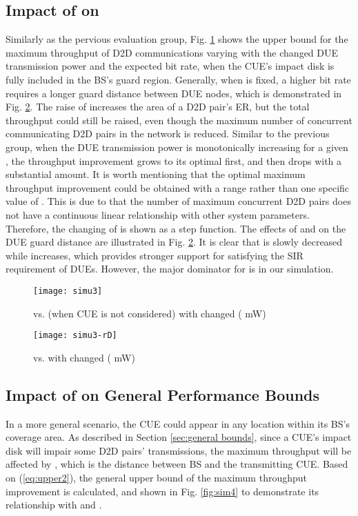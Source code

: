\documentclass[journal, 10pt]{IEEEtran}
\begin{document}
\subsection{Impact of  on }
Similarly as the pervious evaluation group, Fig. \ref{fig:sim2} shows
the upper bound for the maximum throughput of D2D communications
varying with the changed DUE transmission power and the expected bit
rate, when the CUE's impact disk is fully included in the BS's guard
region. Generally, when  is fixed, a higher bit rate
 requires a longer guard distance  between DUE nodes,
which is demonstrated in Fig. \ref{fig:sim2-rD}. The raise of 
increases the area of a D2D pair's ER, but the total throughput could
still be raised, even though the maximum number of concurrent
communicating D2D pairs in the network is reduced. Similar to the
previous group, when the DUE transmission power is monotonically
increasing for a given , the throughput improvement grows to its
optimal first, and then drops with a substantial amount. It is worth
mentioning that the optimal maximum throughput improvement could be
obtained with a range rather than one specific value of
. This is due to that the number of maximum concurrent
D2D pairs does not have a continuous linear relationship with other
system parameters. Therefore, the changing of 
is shown as a step function. The effects of
 and  on the DUE guard distance 
are illustrated in Fig. \ref{fig:sim2-rD}. It is clear that
 is slowly decreased while  increases,
which provides stronger support for satisfying the SIR requirement of
DUEs. However, the major dominator for  is  in our
simulation. 

\begin{figure}[!htb]
\centering \texttt{[image: simu3]} \caption{ vs.  
(when CUE is not considered) with changed   
( mW)} \label{fig:sim2}
\end{figure}
\begin{figure}[!htb]
\centering \texttt{[image: simu3-rD]} \caption{ vs.  with changed  
( mW)} \label{fig:sim2-rD}
\end{figure}

\subsection{Impact of  on General Performance Bounds}
\label{sec:simu-c}
In a more general scenario, the CUE could appear in any location
within its BS's coverage area. As described in Section
\ref{sec:general bounds}, since a CUE's impact disk will impair some
D2D pairs' transmissions, the maximum throughput will be affected by
, which is the distance between BS and the
transmitting CUE. Based on (\ref{eq:upper2}), the general upper bound
of the maximum throughput improvement  is calculated, and shown in Fig.
\ref{fig:sim4} to demonstrate its relationship with 
and . 
\end{document}
